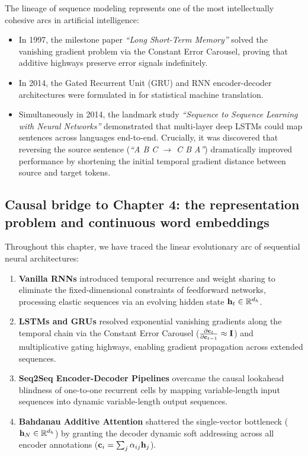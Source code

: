 \documentclass[../../main.tex]{subfiles}
\begin{document}
\begin{deepdive}
The lineage of sequence modeling represents one of the most intellectually cohesive arcs in artificial intelligence:
\begin{itemize}
    \item In 1997, the milestone paper \textit{``Long Short-Term Memory''} \cite{hochreiter1997} solved the vanishing gradient problem via the Constant Error Carousel, proving that additive highways preserve error signals indefinitely.
    \item In 2014, the Gated Recurrent Unit (GRU) and RNN encoder-decoder architectures were formulated in \cite{cho2014} for statistical machine translation.
    \item Simultaneously in 2014, the landmark study \textit{``Sequence to Sequence Learning with Neural Networks''} \cite{sutskever2014} demonstrated that multi-layer deep LSTMs could map sentences across languages end-to-end. Crucially, it was discovered that reversing the source sentence (\textit{``A B C $\to$ C B A''}) dramatically improved performance by shortening the initial temporal gradient distance between source and target tokens.
\end{itemize}
\end{deepdive}

\subsection{Causal bridge to Chapter 4: the representation problem and continuous word embeddings}
\label{subsec:bridge_to_chapter_4}

Throughout this chapter, we have traced the linear evolutionary arc of sequential neural architectures:
\begin{enumerate}
    \item \textbf{Vanilla RNNs} introduced temporal recurrence and weight sharing to eliminate the fixed-dimensional constraints of feedforward networks, processing elastic sequences via an evolving hidden state $\mathbf{h}_t \in \mathbb{R}^{d_h}$.
    \item \textbf{LSTMs and GRUs} resolved exponential vanishing gradients along the temporal chain via the Constant Error Carousel ($\frac{\partial \mathbf{c}_t}{\partial \mathbf{c}_{t-1}} \approx \mathbf{I}$) and multiplicative gating highways, enabling gradient propagation across extended sequences.
    \item \textbf{Seq2Seq Encoder-Decoder Pipelines} overcame the causal lookahead blindness of one-to-one recurrent cells by mapping variable-length input sequences into dynamic variable-length output sequences.
    \item \textbf{Bahdanau Additive Attention} shattered the single-vector bottleneck ($\mathbf{h}_N \in \mathbb{R}^{d_h}$) by granting the decoder dynamic soft addressing across all encoder annotations ($\mathbf{c}_i = \sum_j \alpha_{ij} \mathbf{h}_j$).
\end{enumerate}
\end{document}
